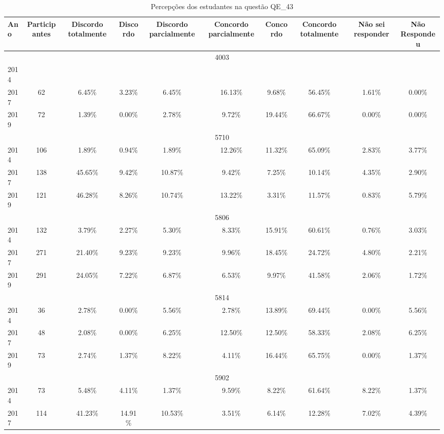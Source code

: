 \begin{table}[H]
\centering
\caption{Percepções dos estudantes na questão QE\_43}
\begin{tabular}{|l|c|ccc|ccc|cc|}
\hline
\toprule
Ano & Participantes & Discordo totalmente & Discordo & Discordo parcialmente & Concordo parcialmente & Concordo & Concordo totalmente & Não sei responder & Não Respondeu \\
\midrule
\hline
\multicolumn{10}{|c|}{4003}\\
\hline
2014 & & & & & & & & & \\
2017 & 62 & 6.45\% & 3.23\% & 6.45\% & 16.13\% & 9.68\% & 56.45\% & 1.61\% & 0.00\%\\
2019 & 72 & 1.39\% & 0.00\% & 2.78\% & 9.72\% & 19.44\% & 66.67\% & 0.00\% & 0.00\%\\
\hline
\hline
\multicolumn{10}{|c|}{5710}\\
\hline
2014 & 106 & 1.89\% & 0.94\% & 1.89\% & 12.26\% & 11.32\% & 65.09\% & 2.83\% & 3.77\%\\
2017 & 138 & 45.65\% & 9.42\% & 10.87\% & 9.42\% & 7.25\% & 10.14\% & 4.35\% & 2.90\%\\
2019 & 121 & 46.28\% & 8.26\% & 10.74\% & 13.22\% & 3.31\% & 11.57\% & 0.83\% & 5.79\%\\
\hline
\hline
\multicolumn{10}{|c|}{5806}\\
\hline
2014 & 132 & 3.79\% & 2.27\% & 5.30\% & 8.33\% & 15.91\% & 60.61\% & 0.76\% & 3.03\%\\
2017 & 271 & 21.40\% & 9.23\% & 9.23\% & 9.96\% & 18.45\% & 24.72\% & 4.80\% & 2.21\%\\
2019 & 291 & 24.05\% & 7.22\% & 6.87\% & 6.53\% & 9.97\% & 41.58\% & 2.06\% & 1.72\%\\
\hline
\hline
\multicolumn{10}{|c|}{5814}\\
\hline
2014 & 36 & 2.78\% & 0.00\% & 5.56\% & 2.78\% & 13.89\% & 69.44\% & 0.00\% & 5.56\%\\
2017 & 48 & 2.08\% & 0.00\% & 6.25\% & 12.50\% & 12.50\% & 58.33\% & 2.08\% & 6.25\%\\
2019 & 73 & 2.74\% & 1.37\% & 8.22\% & 4.11\% & 16.44\% & 65.75\% & 0.00\% & 1.37\%\\
\hline
\hline
\multicolumn{10}{|c|}{5902}\\
\hline
2014 & 73 & 5.48\% & 4.11\% & 1.37\% & 9.59\% & 8.22\% & 61.64\% & 8.22\% & 1.37\%\\
2017 & 114 & 41.23\% & 14.91\% & 10.53\% & 3.51\% & 6.14\% & 12.28\% & 7.02\% & 4.39\%\\

\end{tabular}
\end{table}
